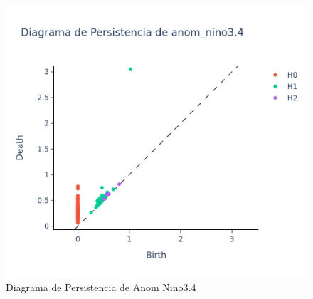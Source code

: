 \documentclass{article}
\begin{document}
\begin{figure}[!htbp]
\begin{minipage}{0.45\textwidth}
                    \includegraphics[scale=0.2]{anom_nino3.4_persistence.png}
                    \caption{Diagrama de Persistencia de Anom Nino3.4}
                    \label{fig:anom_nino34_pers}
                \end{minipage}
            \end{figure}
\end{document}
